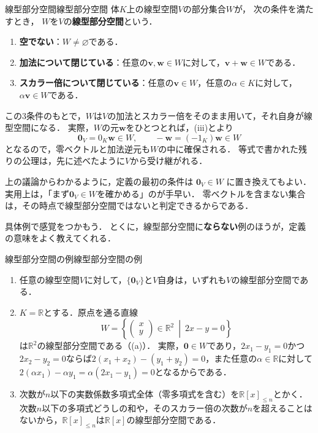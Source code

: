 \begin{definition}{線型部分空間}{線型部分空間}
  体$K$上の線型空間$V$の部分集合$W$が，
  次の条件を満たすとき，
  $W$を$V$の\textbf{線型部分空間}という．
  \begin{enumerate}[label=(\roman*),leftmargin=3.2em]
    \item \textbf{空でない}：$W\neq\varnothing$である．
    \item \textbf{加法について閉じている}：任意の$\bm{v},\bm{w}\in W$に対して，$\bm{v}+\bm{w}\in W$である．
    \item \textbf{スカラー倍について閉じている}：任意の$\bm{v}\in W$，任意の$\alpha\in K$に対して，$\alpha \bm{v}\in W$である．
  \end{enumerate}
\end{definition}

この$3$条件のもとで，$W$は$V$の加法とスカラー倍をそのまま用いて，それ自身が線型空間になる．
実際，$W$の元$\bm{w}$をひとつとれば，(iii)とより
\[
  \bm{0}_V = 0_K\bm{w}\in W,
  \qquad
  -\bm{w}=(-1_K)\bm{w}\in W
\]
となるので，零ベクトルと加法逆元も$W$の中に確保される．
等式で書かれた残りの公理は，先に述べたように$V$から受け継がれる．

\begin{remark}[空でないことと零ベクトル]
上の議論からわかるように，定義の最初の条件は
$\bm{0}_V\in W$
に置き換えてもよい．
実用上は，「まず$\bm{0}_V\in W$を確かめる」のが手早い．
零ベクトルを含まない集合は，その時点で線型部分空間ではないと判定できるからである．
\end{remark}

具体例で感覚をつかもう．
とくに，線型部分空間に\textbf{ならない}例のほうが，定義の意味をよく教えてくれる．

\begin{example}{線型部分空間の例}{線型部分空間の例}
  \begin{enumerate}[label=(\arabic*),leftmargin=3.2em]
    \item 任意の線型空間$V$に対して，$\{\bm{0}_V\}$と$V$自身は，いずれも$V$の線型部分空間である．
    \item $K = \mathbb{R}$とする．原点を通る直線
      \[
        W = \left\{ \begin{pmatrix} x \\ y \end{pmatrix} \in \mathbb{R}^2 ~\middle|~ 2x - y = 0 \right\}
      \]
      は$\mathbb{R}^2$の線型部分空間である（(a)）．
      実際，$\bm{0} \in W$であり，$2x_1 - y_1 = 0$かつ$2x_2 - y_2 = 0$ならば$2(x_1 + x_2) - (y_1 + y_2) = 0$，また任意の$\alpha \in \mathbb{R}$に対して$2(\alpha x_1) - \alpha y_1 = \alpha(2x_1 - y_1) = 0$となるからである．
    \item 次数が$n$以下の実数係数多項式全体（零多項式を含む）を$\mathbb{R}[x]_{\le n}$とかく．
      次数$n$以下の多項式どうしの和や，そのスカラー倍の次数が$n$を超えることはないから，$\mathbb{R}[x]_{\le n}$は$\mathbb{R}[x]$の線型部分空間である．
  \end{enumerate}
\end{example}

